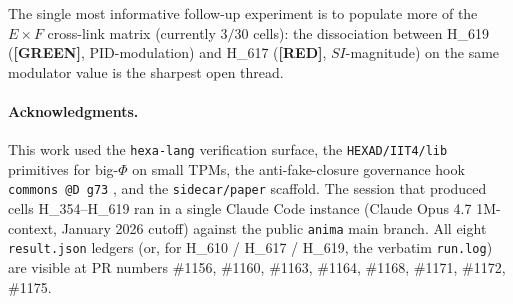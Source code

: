\documentclass[11pt,a4paper]{article}
\providecommand{\tierGreen}{\textbf{[GREEN]}}
\providecommand{\tierRed}{\textbf{[RED]}}
\begin{document}
The single most informative follow-up experiment is to populate
more of the $E \times F$ cross-link matrix
(currently $3/30$ cells): the dissociation
between H\_619 (\tierGreen, PID-modulation) and H\_617
(\tierRed, $SI$-magnitude) on the same modulator value is the
sharpest open thread.

\paragraph{Acknowledgments.}
This work used the \texttt{hexa-lang} verification surface, the
\texttt{HEXAD/IIT4/lib} primitives for big-$\Phi$ on small TPMs, the
anti-fake-closure governance hook \texttt{commons @D g73}
\citep{anima_g73}, and the \texttt{sidecar/paper} scaffold. The
session that produced cells H\_354--H\_619 ran in a single Claude
Code instance (Claude Opus 4.7 1M-context, January 2026 cutoff)
against the public \texttt{anima} main branch. All eight
\texttt{result.json} ledgers (or, for H\_610 / H\_617 / H\_619, the
verbatim \texttt{run.log}) are visible at PR numbers
\#1156, \#1160, \#1163, \#1164, \#1168, \#1171, \#1172, \#1175.



\end{document}
